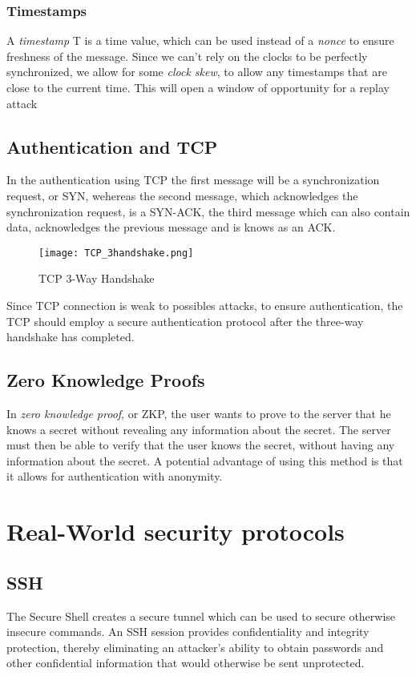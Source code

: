 \documentclass[a4paper]{article}
\begin{document}
\subsubsection{Timestamps}
A \textit{timestamp} T is a time value, which can be used instead of a \textit{nonce} to ensure freshness of the message. Since we can't rely on the clocks to be perfectly synchronized, we allow for some \textit{clock skew}, to allow any timestamps that are close to the current time. This will open a window of opportunity for a replay attack

\subsection{Authentication and TCP}
In the authentication using TCP the first message will be a synchronization request, or SYN, wehereas the second message, which acknowledges the synchronization request, is a SYN-ACK, the third message which can also contain data, acknowledges the previous message and is knows as an ACK.\\
\begin{figure}[H]
    \centering
    \texttt{[image: TCP\_3handshake.png]}
    \caption{TCP 3-Way Handshake}
\end{figure}
Since TCP connection is weak to possibles attacks, to ensure authentication, the TCP should employ a secure authentication protocol after the three-way handshake has completed.

\subsection{Zero Knowledge Proofs}
In \textit{zero knowledge proof}, or ZKP, the user wants to prove to the server that he knows a secret without revealing any information about the secret. The server must then be able to verify that the user knows the secret, without having any information about the secret. A potential advantage of using this method is that it allows for authentication with anonymity.

\newpage
\section{Real-World security protocols}
\subsection{SSH}
The Secure Shell creates a secure tunnel which can be used to secure otherwise insecure commands. An SSH session provides confidentiality and integrity protection, thereby eliminating an attacker's ability to obtain passwords and other confidential information that would otherwise be sent unprotected.
\end{document}
